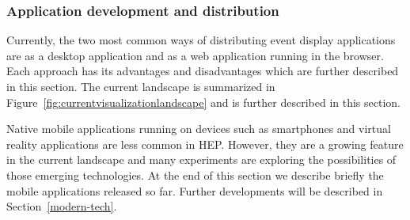 \documentclass[12pt,a4paper]{article}
\begin{document}



\hypertarget{application-development}{%
\subsubsection{Application development and distribution}\label{application-development}}

Currently, the two most common ways of distributing event display applications are as a desktop application and as a web
application running in the browser. Each approach has its advantages and disadvantages which are further described in this section.
The current landscape is summarized in Figure~\ref{fig:currentvisualizationlandscape} and is further described in this section.

Native mobile applications running on devices such as smartphones and virtual reality applications are less common in HEP.
However, they are a growing feature in the current landscape and many experiments are exploring the
possibilities of those emerging technologies. At the end of this section we describe briefly the mobile applications released so far.
Further developments will be described in
Section~\ref{modern-tech}.
\end{document}
